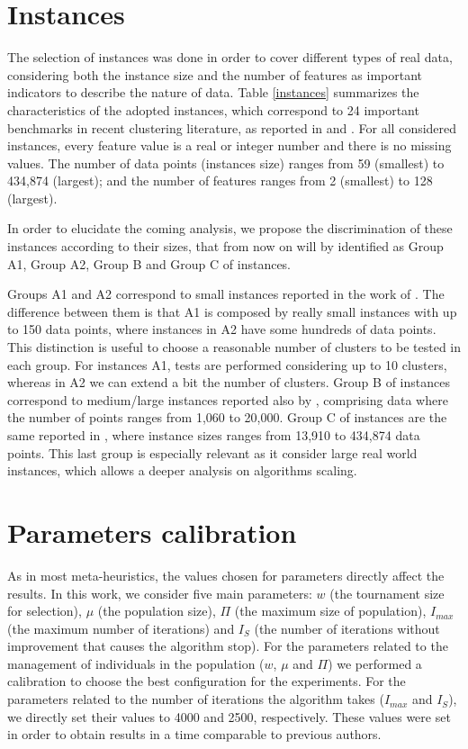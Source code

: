 \section{Instances}
\label{sec:instances}
The selection of instances was done in order to cover different types of real data, considering both the instance size and the number of features as important indicators to describe the nature of data. Table \ref{instances} summarizes the characteristics of the adopted instances, which correspond to 24 important benchmarks in recent clustering literature, as reported in \cite{Ordin2014} and \cite{Bagirov2016}. For all considered instances, every feature value is a real or integer number and there is no missing values. The number of data points (instances size) ranges from 59 (smallest) to 434,874 (largest); and the number of features ranges from 2 (smallest) to 128 (largest).

In order to elucidate the coming analysis, we propose the discrimination of these instances according to their sizes, that from now on will by identified as Group A1, Group A2, Group B and Group C of instances.

Groups A1 and A2 correspond to small instances reported in the work of \cite{Ordin2014}. The difference between them is that A1 is composed by really small instances with up to 150 data points, where instances in A2 have some hundreds of data points. This distinction is useful to choose a reasonable number of clusters to be tested in each group. For instances A1, tests are performed considering up to 10 clusters, whereas in A2 we can extend a bit the number of clusters. Group B of instances correspond to medium/large instances reported also by \cite{Ordin2014}, comprising data where the number of points ranges from 1,060 to 20,000. Group C of instances are the same reported in \cite{Bagirov2016}, where instance sizes ranges from 13,910 to 434,874 data points. This last group is especially relevant as it consider large real world instances, which allows a deeper analysis on algorithms scaling.



\section{Parameters calibration}
\label{sec:calibration}
As in most meta-heuristics, the values chosen for parameters directly affect the results. In this work, we consider five main parameters: $w$ (the tournament size for selection), $\mu$ (the population size), $\Pi$ (the maximum size of population), $I_{max}$ (the maximum number of iterations) and $I_S$ (the number of iterations without improvement that causes the algorithm stop). For the parameters related to the management of individuals in the population ($w$, $\mu$ and $\Pi$) we performed a calibration to choose the best configuration for the experiments. For the parameters related to the number of iterations the algorithm takes ($I_{max}$ and $I_S$), we directly set their values to 4000 and 2500, respectively. These values were set in order to obtain results in a time comparable to previous authors.

